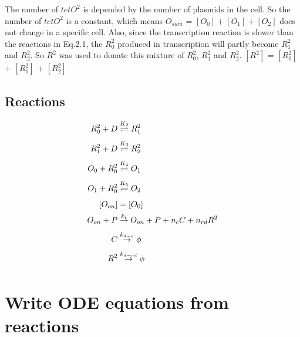 The number of $tetO^{2}$ is depended by the number of plasmids in the cell. So the number of $tetO^{2}$ is a constant, which means $O_{sum}$ = $[O_0]+[O_1]+[O_2]$ does not change in a specific cell. Also, since the transcription reaction is slower than the reactions in Eq.2.1, the $R_0^2$ produced in transcription will partly become $R_1^2$ and $R_2^2$. So $R^2$ was used to donate this mixture of $R_0^2$, $R_1^2$ and $R_2^2$. $[R^2]$ = $[R_0^2]$ + $[R_1^2]$ + $[R_2^2]$

\subsection{Reactions}

\begin{equation*} 
\begin{aligned} 
\centering
R^2_0 + D    &\underset{}{\overset{K_2}{\rightleftharpoons}} R^2_1 \\ 
R^2_1 + D    &\underset{}{\overset{K_3}{\rightleftharpoons}} R^2_2 \\  
O_0 + R^2_0  &\underset{}{\overset{K_4}{\rightleftharpoons}} O_1 \\ 
O_1 + R^2_0  &\underset{}{\overset{K_5}{\rightleftharpoons}} O_2 \\ 
[O_{on}]     &= [O_0] \\
O_{on} + P   &\underset{}{\overset{k_t}{\rightarrow}} O_{on} + P + n_cC + n_{rd}R^2\\
C            &\underset{}{\overset{k_{d-c}}{\rightarrow}} \phi \\  
R^2        &\underset{}{\overset{k_{d-rd}}{\rightarrow}} \phi \\  
\end{aligned} 
\end{equation*}



\section{Write ODE equations from reactions}

